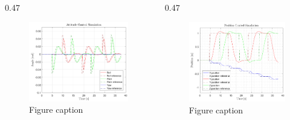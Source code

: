 	\begin{columns}[t,totalwidth=\twocolwid] %
		
		\begin{column}{0.47\twocolwid}%
			\begin{figure}
				\includegraphics[width=0.8\linewidth]{figures/AttitudeControl}
				\caption{Figure caption}
			\end{figure}
		\end{column} %
		
		\begin{column}{0.47\twocolwid}%
			\begin{figure}
				\includegraphics[width=0.8\linewidth]{figures/PositionControl}
				\caption{Figure caption}
			\end{figure}	
		\end{column} %
		
	\end{columns} %